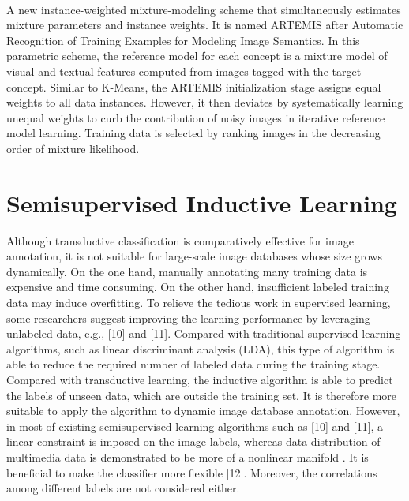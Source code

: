 \documentclass[a4paper,11pt]{report}
\begin{document}
\paragraph{}
 A new instance-weighted mixture-modeling scheme that simultaneously estimates mixture parameters and instance weights. It is named ARTEMIS after Automatic Recognition of Training Examples for Modeling Image Semantics. In this parametric scheme, the reference model for each concept is a mixture model of visual and textual features computed from images tagged with the target concept. Similar to K-Means, the ARTEMIS initialization stage assigns equal weights to all data instances. However, it then deviates by systematically learning unequal weights to curb the contribution of noisy images in iterative reference model learning. Training data is selected by ranking images in the decreasing order of mixture likelihood.


\section{Semisupervised Inductive Learning}
Although transductive classification is comparatively
effective for image annotation, it is not suitable for large-scale
image databases whose size grows dynamically. On the one
hand, manually annotating many training data is expensive
and time consuming. On the other hand, insufficient labeled
training data may induce overfitting. To relieve the tedious work
in supervised learning, some researchers suggest improving the
learning performance by leveraging unlabeled data, e.g., [10]
and [11]. Compared with traditional supervised learning algorithms,
such as linear discriminant analysis (LDA), this type
of algorithm is able to reduce the required number of labeled
data during the training stage. Compared with transductive
learning, the inductive algorithm is able to predict the labels of
unseen data, which are outside the training set. It is therefore
more suitable to apply the algorithm to dynamic image database
annotation. However, in most of existing semisupervised
learning algorithms such as [10] and [11], a linear constraint
is imposed on the image labels, whereas data distribution of
multimedia data is demonstrated to be more of a nonlinear
manifold . It is beneficial to make the classifier more
flexible [12]. Moreover, the correlations among different labels
are not considered either.
\end{document}
